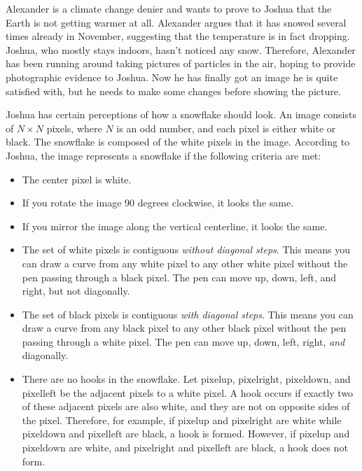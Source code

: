 Alexander is a climate change denier and wants to prove to Joshua that the Earth is not getting warmer at all.
Alexander argues that it has snowed several times already in November, suggesting that the temperature is in fact dropping.
Joshua, who mostly stays indoors, hasn't noticed any snow. 
Therefore, Alexander has been running around taking pictures of particles in the air, 
hoping to provide photographic evidence to Joshua. 
Now he has finally got an image he is quite satisfied with, 
but he needs to make some changes before showing the picture.

Joshua has certain perceptions of how a snowflake should look. 
An image consists of $N \times N$ pixels, where $N$ is an odd number, 
and each pixel is either white or black. 
The snowflake is composed of the white pixels in the image. 
According to Joshua, the image represents a snowflake if the following criteria are met:


\begin{itemize}
\item The center pixel is white.
\item If you rotate the image 90 degrees clockwise, it looks the same.
\item If you mirror the image along the vertical centerline, it looks the same.
\item The set of white pixels is contiguous \emph{without diagonal steps}. 
  This means you can draw a curve from any white pixel to any other white pixel without the pen passing through a black pixel. 
  The pen can move up, down, left, and right, but not diagonally.
\item The set of black pixels is contiguous \emph{with diagonal steps}. 
This means you can draw a curve from any black pixel to any other black pixel without the pen passing through a white pixel. 
  The pen can move up, down, left, right, \emph{and} diagonally.
  \item There are no hooks in the snowflake. Let $\text{pixel}\text{up}$, $\text{pixel}\text{right}$, $\text{pixel}\text{down}$, and $\text{pixel}\text{left}$ be the adjacent pixels to a white pixel. A hook occurs if exactly two of these adjacent pixels are also white, and they are not on opposite sides of the pixel. Therefore, for example, if $\text{pixel}\text{up}$ and $\text{pixel}\text{right}$ are white while $\text{pixel}\text{down}$ and $\text{pixel}\text{left}$ are black, a hook is formed. However, if $\text{pixel}\text{up}$ and $\text{pixel}\text{down}$ are white, and $\text{pixel}\text{right}$ and $\text{pixel}\text{left}$ are black, a hook does not form.

\end{itemize}

